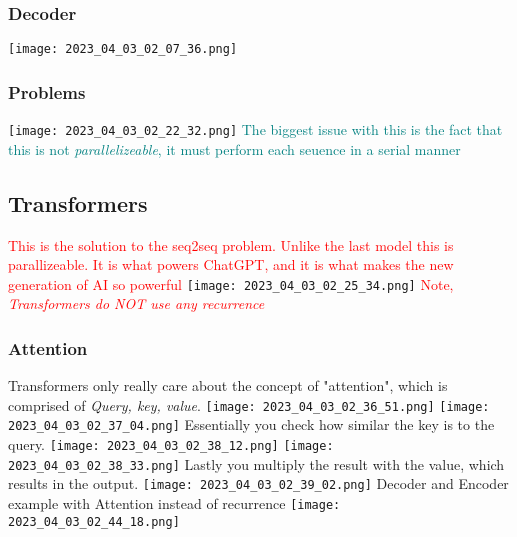 \documentclass[main.tex,fontsize=8pt,paper=a4,paper=portrait,DIV=calc,]{scrartcl}
\begin{document}
\subsubsection{Decoder}
\texttt{[image: 2023\_04\_03\_02\_07\_36.png]}

\subsubsection{Problems}
\texttt{[image: 2023\_04\_03\_02\_22\_32.png]}\newline
\textcolor{teal}{The biggest issue with this is the fact that this is not \emph{parallelizeable}, it must perform each seuence in a serial manner}

\subsection{Transformers}
\textcolor{red}{This is the solution to the seq2seq problem. Unlike the last model this is parallizeable. \newline
It is what powers ChatGPT, and it is what makes the new generation of AI so powerful}\newline
\texttt{[image: 2023\_04\_03\_02\_25\_34.png]}\newline
\textcolor{red}{Note, \emph{Transformers do NOT use any recurrence}}

\subsubsection{Attention}
Transformers only really care about the concept of "attention", which is comprised of \emph{Query, key, value}.\newline
\texttt{[image: 2023\_04\_03\_02\_36\_51.png]}\newline
\texttt{[image: 2023\_04\_03\_02\_37\_04.png]}\newline
Essentially you check how similar the key is to the query.\newline
\texttt{[image: 2023\_04\_03\_02\_38\_12.png]}\newline
\texttt{[image: 2023\_04\_03\_02\_38\_33.png]}\newline
Lastly you multiply the result with the value, which results in the output.\newline
\texttt{[image: 2023\_04\_03\_02\_39\_02.png]}\newline
Decoder and Encoder example with Attention instead of recurrence\newline
\texttt{[image: 2023\_04\_03\_02\_44\_18.png]}
\end{document}
